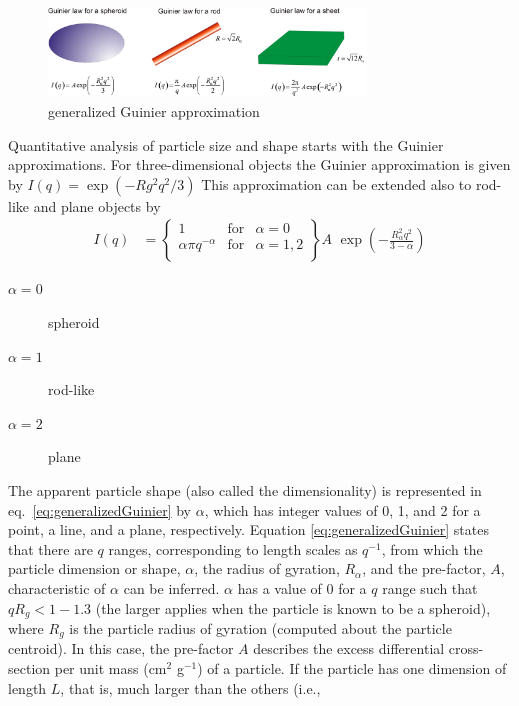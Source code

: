 \begin{figure}[htb]
\begin{center}
\includegraphics[width=0.75\textwidth]{generalizedGuinier_q.png}
\end{center}
\caption{generalized Guinier approximation}
\end{figure}
Quantitative analysis of particle size and shape starts with the
Guinier approximations. For three-dimensional objects the Guinier
approximation is given by $I(q) = \exp(-Rg^2q^2/3)$ This
approximation can be extended also to rod-like and plane objects by
\begin{align}
I(q) &= \left\{
\begin{array}{lll}
  1 & \mbox{for} & \alpha=0 \\
  \alpha \pi q^{-\alpha} & \mbox{for} & \alpha=1,2 \\
\end{array}
\right\} A \,\, \exp\left(-\frac{R_\alpha^2 q^2}{3-\alpha}\right)
\label{eq:generalizedGuinier}
\end{align}
\begin{description}
\item[$\alpha=0$] spheroid
\item[$\alpha=1$] rod-like
\item[$\alpha=2$] plane
\end{description}
The apparent particle shape (also called the dimensionality) is
represented in eq.\ \ref{eq:generalizedGuinier} by $\alpha$, which
has integer values of 0, 1, and 2 for a point, a line, and a plane,
respectively. Equation \ref{eq:generalizedGuinier} states that there
are $q$ ranges, corresponding to length scales as $q^{-1}$, from
which the particle dimension or shape, $\alpha$, the radius of
gyration, $R_\alpha$, and the pre-factor, $A$, characteristic of
$\alpha$ can be inferred. $\alpha$ has a value of 0 for a $q$ range
such that $qR_g < 1-1.3$ (the larger applies when the particle is
known to be a spheroid), where $R_g$ is the particle radius of
gyration (computed about the particle centroid). In this case, the
pre-factor $A$ describes the excess differential cross-section per
unit mass (cm$^2$ g$^{-1}$) of a particle. If the particle has one
dimension of length $L$, that is, much larger than the others (i.e.,
